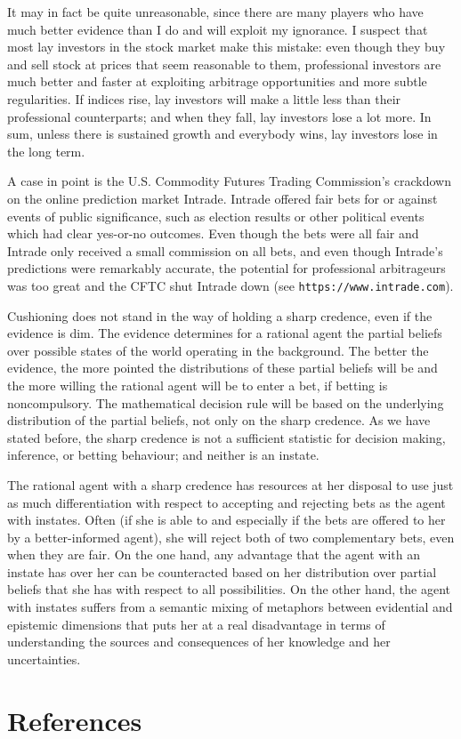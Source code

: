 \documentclass[11pt]{article}
\begin{document}
It may in fact be quite unreasonable, since there are many players who have much better evidence than I do and will exploit my ignorance. I suspect that most lay investors in the stock market make this mistake: even though they buy and sell stock at prices that seem reasonable to them, professional investors are much better and faster at exploiting arbitrage opportunities and more subtle regularities. If indices rise, lay investors will make a little less than their professional counterparts; and when they fall, lay investors lose a lot more. In sum, unless there is sustained growth and everybody wins, lay investors lose in the long term.

A case in point is the U.S. Commodity Futures Trading Commission's crackdown on the online prediction market Intrade. Intrade offered fair bets for or against events of public significance, such as election results or other political events which had clear yes-or-no outcomes. Even though the bets were all fair and Intrade only received a small commission on all bets, and even though Intrade's predictions were remarkably accurate, the potential for professional arbitrageurs was too great and the CFTC shut Intrade down (see \texttt{https://www.intrade.com}).

Cushioning does not stand in the way of holding a sharp credence, even if the evidence is dim. The evidence determines for a rational agent the partial beliefs over possible states of the world operating in the background. The better the evidence, the more pointed the distributions of these partial beliefs will be and the more willing the rational agent will be to enter a bet, if betting is noncompulsory. The mathematical decision rule will be based on the underlying distribution of the partial beliefs, not only on the sharp credence. As we have stated before, the sharp credence is not a sufficient statistic for decision making, inference, or betting behaviour; and neither is an instate. 

The rational agent with a sharp credence has resources at her disposal to use just as much differentiation with respect to accepting and rejecting bets as the agent with instates. Often (if she is able to and especially if the bets are offered to her by a better-informed agent), she will reject both of two complementary bets, even when they are fair. On the one hand, any advantage that the agent with an instate has over her can be counteracted based on her distribution over partial beliefs that she has with respect to all possibilities. On the other hand, the agent with instates suffers from a semantic mixing of metaphors between evidential and epistemic dimensions that puts her at a real disadvantage in terms of understanding the sources and consequences of her knowledge and her uncertainties.

\section{References}
\label{References}

 

\end{document}
